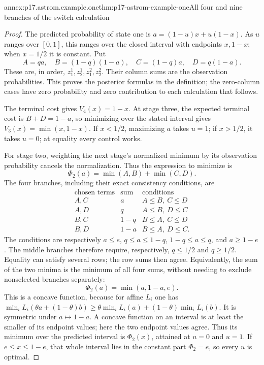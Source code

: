 \begin{annexitem}{annex:p17.astrom.example.one}{thm:p17-astrom-example-one}{All four and nine branches of the switch calculation}
\begin{proof}
The predicted probability of state one is
\(a=(1-u)x+u(1-x)\). As \(u\) ranges over \([0,1]\),
this ranges over the closed interval with endpoints
\(x,1-x\); when \(x=1/2\) it is constant.
Put
\[
 A=qa,\quad B=(1-q)(1-a),\quad
 C=(1-q)a,\quad D=q(1-a).
\]
These are, in order, \(z_1^1,z_2^1,z_1^2,z_2^2\).
Their column sums are the observation probabilities.
This proves the posterior formulas in the definition;
the zero-column cases have zero probability and zero
contribution to each calculation that follows.

The terminal cost gives \(V_4(x)=1-x\).
At stage three, the expected terminal cost is
\(B+D=1-a\), so minimizing over the stated interval
gives \(V_3(x)=\min(x,1-x)\).
If \(x<1/2\), maximizing \(a\) takes \(u=1\);
if \(x>1/2\), it takes \(u=0\); at equality every
control works.

For stage two, weighting the next stage's normalized
minimum by its observation probability cancels the
normalization. Thus the expression to minimize is
\[
                   \Phi_2(a)=\min(A,B)+\min(C,D).
\]
The four branches, including their exact consistency
conditions, are
\[
 \begin{array}{c|c|c}
 \text{chosen terms}&\text{sum}&\text{conditions}\\ \hline
 A,C&a&A\leq B,\ C\leq D\\
 A,D&q&A\leq B,\ D\leq C\\
 B,C&1-q&B\leq A,\ C\leq D\\
 B,D&1-a&B\leq A,\ D\leq C .
 \end{array}
\]
The conditions are respectively
\(a\leq e\), \(q\leq a\leq1-q\),
\(1-q\leq a\leq q\), and \(a\geq1-e\).
The middle branches therefore require, respectively,
\(q\leq1/2\) and \(q\geq1/2\).
Equality can satisfy several rows; the row sums then
agree. Equivalently, the sum of the two minima is
the minimum of all four sums, without needing to
exclude nonselected branches separately:
\[
                      \Phi_2(a)=\min(a,1-a,e).
\]
This is a concave function, because for affine \(L_i\)
one has
\(\min_iL_i(\theta a+(1-\theta)b)
 \geq\theta\min_iL_i(a)+(1-\theta)\min_iL_i(b)\).
It is symmetric under \(a\mapsto1-a\).
A concave function on an interval is at least the
smaller of its endpoint values; here the two endpoint
values agree. Thus its minimum over the predicted
interval is \(\Phi_2(x)\), attained at \(u=0\) and \(u=1\).
If \(e\leq x\leq1-e\), that whole interval lies in
the constant part \(\Phi_2=e\), so every \(u\) is optimal.


\end{proof}
\end{annexitem}
